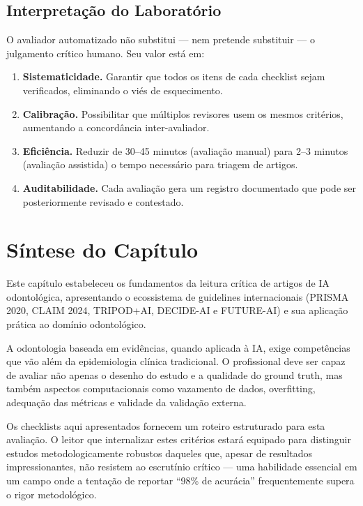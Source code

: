 \subsection{Interpretação do Laboratório}

O avaliador automatizado não substitui — nem pretende substituir — o julgamento crítico humano. Seu valor está em:
\begin{enumerate}
    \item \textbf{Sistematicidade.} Garantir que todos os itens de cada checklist sejam verificados, eliminando o viés de esquecimento.
    \item \textbf{Calibração.} Possibilitar que múltiplos revisores usem os mesmos critérios, aumentando a concordância inter-avaliador.
    \item \textbf{Eficiência.} Reduzir de 30--45 minutos (avaliação manual) para 2--3 minutos (avaliação assistida) o tempo necessário para triagem de artigos.
    \item \textbf{Auditabilidade.} Cada avaliação gera um registro documentado que pode ser posteriormente revisado e contestado.
\end{enumerate}

\section{Síntese do Capítulo}

Este capítulo estabeleceu os fundamentos da leitura crítica de artigos de IA odontológica, apresentando o ecossistema de guidelines internacionais (PRISMA 2020, CLAIM 2024, TRIPOD+AI, DECIDE-AI e FUTURE-AI) e sua aplicação prática ao domínio odontológico.

A odontologia baseada em evidências, quando aplicada à IA, exige competências que vão além da epidemiologia clínica tradicional. O profissional deve ser capaz de avaliar não apenas o desenho do estudo e a qualidade do ground truth, mas também aspectos computacionais como vazamento de dados, overfitting, adequação das métricas e validade da validação externa.

Os checklists aqui apresentados fornecem um roteiro estruturado para esta avaliação. O leitor que internalizar estes critérios estará equipado para distinguir estudos metodologicamente robustos daqueles que, apesar de resultados impressionantes, não resistem ao escrutínio crítico — uma habilidade essencial em um campo onde a tentação de reportar ``98\% de acurácia'' frequentemente supera o rigor metodológico.

